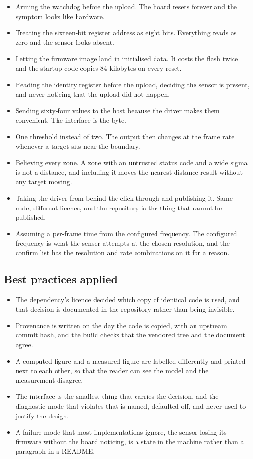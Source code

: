 \begin{itemize}
\item Arming the watchdog before the upload. The board resets forever and the
symptom looks like hardware.
\item Treating the sixteen-bit register address as eight bits. Everything reads
as zero and the sensor looks absent.
\item Letting the firmware image land in initialised data. It costs the flash
twice and the startup code copies 84 kilobytes on every reset.
\item Reading the identity register before the upload, deciding the sensor is
present, and never noticing that the upload did not happen.
\item Sending sixty-four values to the host because the driver makes them
convenient. The interface is the byte.
\item One threshold instead of two. The output then changes at the frame rate
whenever a target sits near the boundary.
\item Believing every zone. A zone with an untrusted status code and a wide
sigma is not a distance, and including it moves the nearest-distance result
without any target moving.
\item Taking the driver from behind the click-through and publishing it. Same
code, different licence, and the repository is the thing that cannot be
published.
\item Assuming a per-frame time from the configured frequency. The configured
frequency is what the sensor attempts at the chosen resolution, and the confirm
list has the resolution and rate combinations on it for a reason.
\end{itemize}

\subsection*{Best practices applied}

\begin{itemize}
\item The dependency's licence decided which copy of identical code is used, and
that decision is documented in the repository rather than being invisible.
\item Provenance is written on the day the code is copied, with an upstream
commit hash, and the build checks that the vendored tree and the document agree.
\item A computed figure and a measured figure are labelled differently and
printed next to each other, so that the reader can see the model and the
measurement disagree.
\item The interface is the smallest thing that carries the decision, and the
diagnostic mode that violates that is named, defaulted off, and never used to
justify the design.
\item A failure mode that most implementations ignore, the sensor losing its
firmware without the board noticing, is a state in the machine rather than a
paragraph in a README.
\end{itemize}

